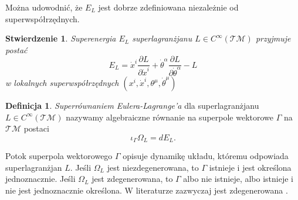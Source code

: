 \documentclass[11pt,a4paper]{report}
\newtheorem{proposition}[theorem]{Stwierdzenie}
\theoremstyle{definition}
\newtheorem{definition}[theorem]{Definicja}
\begin{document}
Można udowodnić, że $E_L$ jest dobrze zdefiniowana niezależnie od superwspółrzędnych.

\begin{proposition}\label{PostacSuperEnergia} Superenergia $E_L$ superlagranżjanu $L\in C^\infty(\mathcal{TM})$   przyjmuje postać
 \begin{equation*}
  E_L = \dot x^i\frac{\partial L}{\partial \dot x^i}+\dot\theta^\alpha\frac{\partial L}{\partial \dot \theta^\alpha}-L
 \end{equation*}
 w lokalnych superwspółrzędnych $(x^i, \dot x^i, \theta^\mu, \dot \theta^\mu )$
 \end{proposition}


\begin{definition}
 \textit{Superrównaniem Eulera-Lagrange'a} dla superlagranżjanu $L\in C^\infty(\mathcal{TM})$ nazywamy algebraiczne równanie na superpole wektorowe $\Gamma$ na $\mathcal{TM}$ postaci
 \begin{equation}
 \label{eq:sele}
  \iota_\Gamma \Omega_L = dE_L.
 \end{equation}
\end{definition}

Potok superpola wektorowego $\Gamma$ opisuje dynamikę układu, któremu odpowiada superlagranżjan $L$. Jeśli $\Omega_L$ jest niezdegenerowana, to $\Gamma$ istnieje i jest określona jednoznacznie. Jeśli $\Omega_L$ jest zdegenerowana, to $\Gamma$ albo nie istnieje, albo istnieje i nie jest jednoznacznie określona. W literaturze zazwyczaj jest zdegenerowana \cite{So99}.
\end{document}
